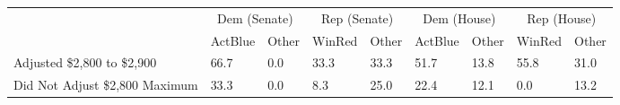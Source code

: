\begin{tabular}{lll|ll|ll|ll}
  & \multicolumn{2}{c}{Dem (Senate)}& \multicolumn{2}{c}{Rep (Senate)}& \multicolumn{2}{c}{Dem (House)}& \multicolumn{2}{c}{Rep (House)}\\  & ActBlue & Other & WinRed & Other & ActBlue & Other & WinRed & Other \\ 
  \midrule
Adjusted \$2,800 to \$2,900 & 66.7 & 0.0 & 33.3 & 33.3 & 51.7 & 13.8 & 55.8 & 31.0 \\ 
  Did Not Adjust \$2,800 Maximum & 33.3 & 0.0 & 8.3 & 25.0 & 22.4 & 12.1 & 0.0 & 13.2 \\ 
  \end{tabular}
